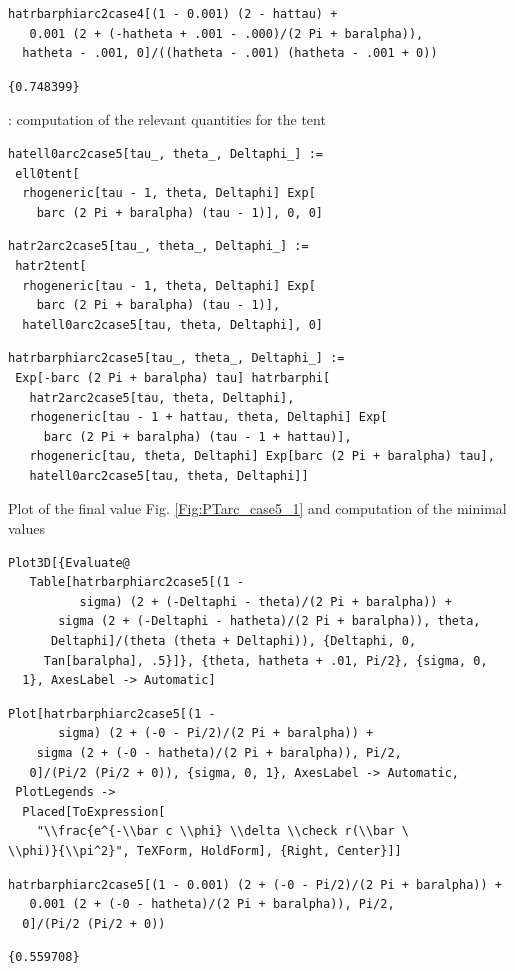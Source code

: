 \documentclass[reqno]{amsart}
\theoremstyle{definition} \newtheorem{definition}{Definition}[section]
\theoremstyle{definition} \newtheorem{remark}[definition]{Remark}
\theoremstyle{plain} \newtheorem{lemma}[definition]{Lemma}
\theoremstyle{plain} \newtheorem{proposition}[definition]{Proposition}
\theoremstyle{plain} \newtheorem{theorem}[definition]{Theorem}
\theoremstyle{plain} \newtheorem{corollary}[definition]{Corollary}
\theoremstyle{definition} \newtheorem{example}[definition]{Example}
\theoremstyle{plain} \newtheorem{claim}[clai]{Claim}
\theoremstyle{definition} \newtheorem{assumption}[definition]{Assumption}
\theoremstyle{definition} \newtheorem{observation}[definition]{Observation}
\newcommand{\1}{\mathbbm 1}
\newcommand{\smed}{\medskip}
\newcommand{\sbig}{\bigskip}
\numberwithin{equation}{section} %
\theoremstyle{plain} \newtheorem*{theorem*}{Theorem}
\theoremstyle{plain} \newtheorem{mthm}[maintheorem]{Main Theorem}
\theoremstyle{plain} \newtheorem*{mthm*}{Main Theorem}
\theoremstyle{plain} \newtheorem*{conjecture*}{Conjecture}
\theoremstyle{plain} \newtheorem{conjecture}[definition]{Conjecture}
\theoremstyle{plain} \newtheorem*{problem*}{Problem}
\begin{document}
\begin{verbatim}
hatrbarphiarc2case4[(1 - 0.001) (2 - hattau) + 
   0.001 (2 + (-hatheta + .001 - .000)/(2 Pi + baralpha)), 
  hatheta - .001, 0]/((hatheta - .001) (hatheta - .001 + 0))
\end{verbatim}
\begin{verbatim}
{0.748399}
\end{verbatim}

\sbig

: computation of the relevant quantities for the tent
\smed
\begin{verbatim}
hatell0arc2case5[tau_, theta_, Deltaphi_] := 
 ell0tent[
  rhogeneric[tau - 1, theta, Deltaphi] Exp[
    barc (2 Pi + baralpha) (tau - 1)], 0, 0]
\end{verbatim}
\begin{verbatim}
hatr2arc2case5[tau_, theta_, Deltaphi_] := 
 hatr2tent[
  rhogeneric[tau - 1, theta, Deltaphi] Exp[
    barc (2 Pi + baralpha) (tau - 1)], 
  hatell0arc2case5[tau, theta, Deltaphi], 0]
\end{verbatim}
\begin{verbatim}
hatrbarphiarc2case5[tau_, theta_, Deltaphi_] := 
 Exp[-barc (2 Pi + baralpha) tau] hatrbarphi[
   hatr2arc2case5[tau, theta, Deltaphi], 
   rhogeneric[tau - 1 + hattau, theta, Deltaphi] Exp[
     barc (2 Pi + baralpha) (tau - 1 + hattau)], 
   rhogeneric[tau, theta, Deltaphi] Exp[barc (2 Pi + baralpha) tau], 
   hatell0arc2case5[tau, theta, Deltaphi]]
\end{verbatim}
\smed
Plot of the final value Fig. \ref{Fig:PTarc_case5_1} and computation of the minimal values
\smed
\begin{verbatim}
Plot3D[{Evaluate@
   Table[hatrbarphiarc2case5[(1 - 
          sigma) (2 + (-Deltaphi - theta)/(2 Pi + baralpha)) + 
       sigma (2 + (-Deltaphi - hatheta)/(2 Pi + baralpha)), theta, 
      Deltaphi]/(theta (theta + Deltaphi)), {Deltaphi, 0, 
     Tan[baralpha], .5}]}, {theta, hatheta + .01, Pi/2}, {sigma, 0, 
  1}, AxesLabel -> Automatic]
\end{verbatim}
\begin{verbatim}
Plot[hatrbarphiarc2case5[(1 - 
       sigma) (2 + (-0 - Pi/2)/(2 Pi + baralpha)) + 
    sigma (2 + (-0 - hatheta)/(2 Pi + baralpha)), Pi/2, 
   0]/(Pi/2 (Pi/2 + 0)), {sigma, 0, 1}, AxesLabel -> Automatic, 
 PlotLegends -> 
  Placed[ToExpression[
    "\\frac{e^{-\\bar c \\phi} \\delta \\check r(\\bar \
\\phi)}{\\pi^2}", TeXForm, HoldForm], {Right, Center}]]
\end{verbatim}
\begin{verbatim}
hatrbarphiarc2case5[(1 - 0.001) (2 + (-0 - Pi/2)/(2 Pi + baralpha)) + 
   0.001 (2 + (-0 - hatheta)/(2 Pi + baralpha)), Pi/2, 
  0]/(Pi/2 (Pi/2 + 0))
\end{verbatim}
\begin{verbatim}
{0.559708}
\end{verbatim}
\end{document}
